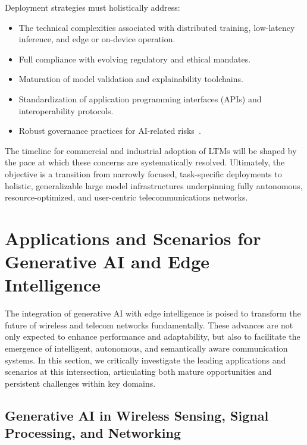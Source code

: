Deployment strategies must holistically address:

\begin{itemize}
    \item The technical complexities associated with distributed training, low-latency inference, and edge or on-device operation.
    \item Full compliance with evolving regulatory and ethical mandates.
    \item Maturation of model validation and explainability toolchains.
    \item Standardization of application programming interfaces (APIs) and interoperability protocols.
    \item Robust governance practices for AI-related risks~\cite{ref46,ref49}.
\end{itemize}

The timeline for commercial and industrial adoption of LTMs will be shaped by the pace at which these concerns are systematically resolved. Ultimately, the objective is a transition from narrowly focused, task-specific deployments to holistic, generalizable large model infrastructures underpinning fully autonomous, resource-optimized, and user-centric telecommunications networks.

\section{Applications and Scenarios for Generative AI and Edge Intelligence}

The integration of generative AI with edge intelligence is poised to transform the future of wireless and telecom networks fundamentally. These advances are not only expected to enhance performance and adaptability, but also to facilitate the emergence of intelligent, autonomous, and semantically aware communication systems. In this section, we critically investigate the leading applications and scenarios at this intersection, articulating both mature opportunities and persistent challenges within key domains.

\subsection{Generative AI in Wireless Sensing, Signal Processing, and Networking}

